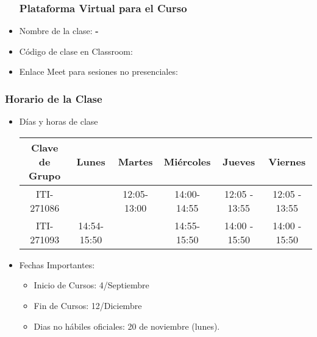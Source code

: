 


\begin{frame}
\begin{itemize}
\frametitle{Plataforma Virtual para el Curso}
\item Nombre de la clase: \textbf{\nombreMateria-\cuatrimestre}
\item Código de clase en Classroom: \textbf{\claveClassroom}
\item Enlace Meet para sesiones no presenciales: \textbf{\claveMeet}
\end{itemize}
\end{frame}



\begin{frame}
\frametitle{Horario de la Clase}


\begin{itemize}
\item Días y horas de clase
\tiny
\begin{spacing}{1.0}
\begin{center}
\begin{tabular}{c|ccccc}
\hline 
\textbf{Clave de Grupo}   & Lunes        & Martes       & Miércoles   & Jueves          & Viernes          \\  \hline 
ITI-271086                &              & 12:05-13:00  & 14:00-14:55 &  12:05 - 13:55  & 12:05 - 13:55    \\
ITI-271093                & 14:54-15:50  &              & 14:55-15:50 &  14:00 - 15:50  & 14:00 - 15:50    \\      
\hline
\end{tabular}
\end{center}
\end{spacing}
\normalsize
\item Fechas Importantes:
\begin{itemize}
\item Inicio de Cursos: 4/Septiembre
\item Fin de Cursos: 12/Diciembre
\item Dias no hábiles oficiales: 20 de noviembre (lunes). 
\end{itemize}
\end{itemize}

\end{frame}



